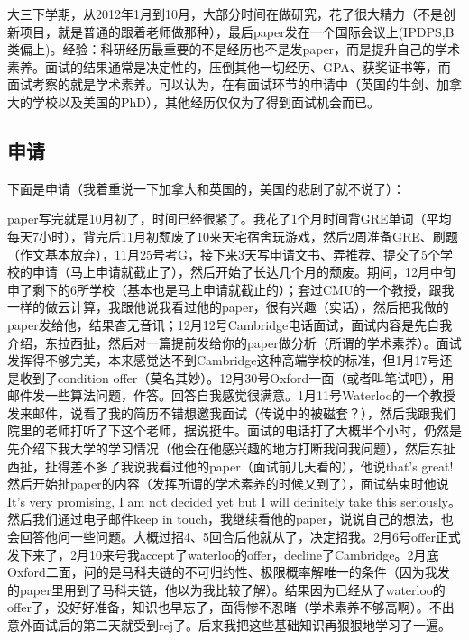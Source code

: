 

大三下学期，从2012年1月到10月，大部分时间在做研究，花了很大精力（不是创新项目，就是普通的跟着老师做那种），最后paper发在一个国际会议上(IPDPS,B类偏上)。经验：科研经历最重要的不是经历也不是发paper，而是提升自己的学术素养。面试的结果通常是决定性的，压倒其他一切经历、GPA、获奖证书等，而面试考察的就是学术素养。可以认为，在有面试环节的申请中（英国的牛剑、加拿大的学校以及美国的PhD），其他经历仅仅为了得到面试机会而已。\par

 
\subsection{申请}
下面是申请（我着重说一下加拿大和英国的，美国的悲剧了就不说了）：\par

paper写完就是10月初了，时间已经很紧了。我花了1个月时间背GRE单词（平均每天7小时），背完后11月初颓废了10来天宅宿舍玩游戏，然后2周准备GRE、刷题（作文基本放弃），11月25号考G，接下来3天写申请文书、弄推荐、提交了5个学校的申请（马上申请就截止了），然后开始了长达几个月的颓废。期间，12月中旬申了剩下的6所学校（基本也是马上申请就截止的）；套过CMU的一个教授，跟我一样的做云计算，我跟他说我看过他的paper，很有兴趣（实话），然后把我做的paper发给他，结果杳无音讯；12月12号Cambridge电话面试，面试内容是先自我介绍，东拉西扯，然后对一篇提前发给你的paper做分析（所谓的学术素养）。面试发挥得不够完美，本来感觉达不到Cambridge这种高端学校的标准，但1月17号还是收到了condition offer（莫名其妙）。12月30号Oxford一面（或者叫笔试吧），用邮件发一些算法问题，作答。回答自我感觉很满意。1月11号Waterloo的一个教授发来邮件，说看了我的简历不错想邀我面试（传说中的被磁套？），然后我跟我们院里的老师打听了下这个老师，据说挺牛。面试的电话打了大概半个小时，仍然是先介绍下我大学的学习情况（他会在他感兴趣的地方打断我问我问题），然后东扯西扯，扯得差不多了我说我看过他的paper（面试前几天看的），他说that’s great! 然后开始扯paper的内容（发挥所谓的学术素养的时候又到了），面试结束时他说It’s very promising, I am not decided yet but I will definitely take this seriously。然后我们通过电子邮件keep in touch，我继续看他的paper，说说自己的想法，也会回答他问一些问题。大概过招4、5回合后他就从了，决定招我。2月6号offer正式发下来了，2月10来号我accept了waterloo的offer，decline了Cambridge。2月底Oxford二面，问的是马科夫链的不可归约性、极限概率解唯一的条件（因为我发的paper里用到了马科夫链，他以为我比较了解）。结果因为已经从了waterloo的offer了，没好好准备，知识也早忘了，面得惨不忍睹（学术素养不够高啊）。不出意外面试后的第二天就受到rej了。后来我把这些基础知识再狠狠地学习了一遍。

